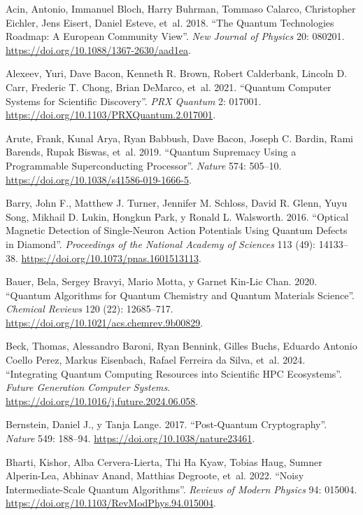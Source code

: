 \documentclass[
  11pt,
  letterpaper,
]{article}
\newlength{\cslhangindent}
\newenvironment{CSLReferences}[2] %
 {\begin{list}{}{%
  \setlength{\itemindent}{0pt}
  \setlength{\leftmargin}{0pt}
  \setlength{\parsep}{0pt}
  \ifodd #1
   \setlength{\leftmargin}{\cslhangindent}
   \setlength{\itemindent}{-1\cslhangindent}
  \fi
  \setlength{\itemsep}{#2\baselineskip}}}
 {\end{list}}
\begin{document}
\label{refs}
\begin{CSLReferences}{1}{0}
Acin, Antonio, Immanuel Bloch, Harry Buhrman, Tommaso Calarco,
Christopher Eichler, Jens Eisert, Daniel Esteve, et~al. 2018. {``The
Quantum Technologies Roadmap: A European Community View''}. \emph{New
Journal of Physics} 20: 080201.
\url{https://doi.org/10.1088/1367-2630/aad1ea}.

Alexeev, Yuri, Dave Bacon, Kenneth R. Brown, Robert Calderbank, Lincoln
D. Carr, Frederic T. Chong, Brian DeMarco, et~al. 2021. {``Quantum
Computer Systems for Scientific Discovery''}. \emph{PRX Quantum} 2:
017001. \url{https://doi.org/10.1103/PRXQuantum.2.017001}.

Arute, Frank, Kunal Arya, Ryan Babbush, Dave Bacon, Joseph C. Bardin,
Rami Barends, Rupak Biswas, et~al. 2019. {``Quantum Supremacy Using a
Programmable Superconducting Processor''}. \emph{Nature} 574: 505--10.
\url{https://doi.org/10.1038/s41586-019-1666-5}.

Barry, John F., Matthew J. Turner, Jennifer M. Schloss, David R. Glenn,
Yuyu Song, Mikhail D. Lukin, Hongkun Park, y Ronald L. Walsworth. 2016.
{``Optical Magnetic Detection of Single-Neuron Action Potentials Using
Quantum Defects in Diamond''}. \emph{Proceedings of the National Academy
of Sciences} 113 (49): 14133--38.
\url{https://doi.org/10.1073/pnas.1601513113}.

Bauer, Bela, Sergey Bravyi, Mario Motta, y Garnet Kin-Lic Chan. 2020.
{``Quantum Algorithms for Quantum Chemistry and Quantum Materials
Science''}. \emph{Chemical Reviews} 120 (22): 12685--717.
\url{https://doi.org/10.1021/acs.chemrev.9b00829}.

Beck, Thomas, Alessandro Baroni, Ryan Bennink, Gilles Buchs, Eduardo
Antonio Coello Perez, Markus Eisenbach, Rafael Ferreira da Silva, et~al.
2024. {``Integrating Quantum Computing Resources into Scientific HPC
Ecosystems''}. \emph{Future Generation Computer Systems}.
\url{https://doi.org/10.1016/j.future.2024.06.058}.

Bernstein, Daniel J., y Tanja Lange. 2017. {``Post-Quantum
Cryptography''}. \emph{Nature} 549: 188--94.
\url{https://doi.org/10.1038/nature23461}.

Bharti, Kishor, Alba Cervera-Lierta, Thi Ha Kyaw, Tobias Haug, Sumner
Alperin-Lea, Abhinav Anand, Matthias Degroote, et~al. 2022. {``Noisy
Intermediate-Scale Quantum Algorithms''}. \emph{Reviews of Modern
Physics} 94: 015004. \url{https://doi.org/10.1103/RevModPhys.94.015004}.


\end{CSLReferences}
\end{document}
